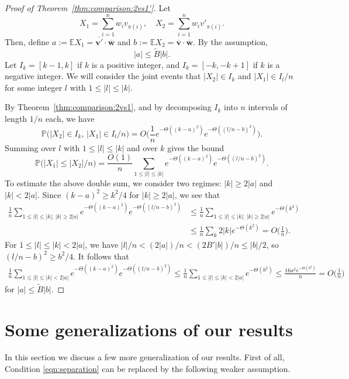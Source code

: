 \documentclass[reqno]{amsart}
\renewcommand\P{{\mathbb{P}}}
\newcommand\E{{\mathbb{E}}}
\newcommand\BMv{{\bm v}}
\newcommand\BMw{{\bm w}}
\theoremstyle{plain}
\theoremstyle{definition}
\begin{document}
\begin{proof}[Proof of Theorem~\ref{thm:comparison:2vs1'}]
Let
\[
X_1 = \sum_{i=1}^{n} w_i v_{\pi(i)}, \quad X_2 = \sum_{i=1}^{n} w_i v'_{\pi(i)}.
\]
Then, define $a:=\E X_1 = \overline{\BMv'} \cdot \overline{\BMw}$ and $b:=\E X_2 = \overline{\BMv} \cdot \overline{\BMw}$. By the assumption, 
\[
|a| \leq \widetilde{B} |b|.
\]
Let $ I_k = [k-1, k] $ if $ k $ is a positive integer, and $ I_k = [-k, -k+1] $ if $ k $ is a negative integer. We will consider the joint events that $|X_{2}| \in I_{k}$ and $|X_{1}| \in I_{l} / n$ for some integer $l$ with $1 \le |l| \le |k|$. 

By Theorem~\ref{thm:comparison:2vs1}, and by decomposing $I_{k}$ into $n$ intervals of length $1/n$ each, we have 
\[
\P\big(|X_{2}| \in I_{k},\, |X_{1}| \in I_{l}/n \big)
= O\Big(\frac{1}{n} e^{-\Theta((k-a)^{2})} e^{-\Theta((l/n-b)^{2})}\Big).
\]
Summing over $l$ with $1\le |l| \le |k|$ and over $k$ gives the bound
\[
\P\big(|X_{1}| \le |X_{2}|/n\big) = \frac{O(1)}{n}\sum_{1\le |l|\le |k|}e^{-\Theta((k-a)^{2})} e^{-\Theta((l/n-b)^{2})}.
\]
To estimate the above double sum, we consider two regimes: $|k| \ge 2|a|$ and $|k|<2|a|$. Since $(k-a)^2 \ge k^2/4$ for $|k|\ge 2|a|$, we see that 
\begin{align*}
\frac{1}{n}\sum_{1\le |l|\le |k|; \, |k|\ge 2|a|}e^{-\Theta((k-a)^{2})} e^{-\Theta((l/n-b)^{2})} &\le \frac{1}{n}\sum_{1\le |l|\le |k|; \, |k|\ge 2|a|}e^{-\Theta(k^{2})}\\
&\le \frac{1}{n}\sum_{k}2|k|e^{-\Theta(k^{2})}=O\Big(\frac{1}{n}\Big).
\end{align*}
For $1\le |l|\le |k|<2|a|$, we have $|l|/n<(2|a|)/n<(2B'|b|)/n\le |b|/2$, so $(l/n-b)^2\ge b^2/4$. It follows that
\begin{align*}
\frac{1}{n}\sum_{1\le |l|\le |k|<2|a|}e^{-\Theta((k-a)^{2})} e^{-\Theta((l/n-b)^{2})} \le \frac{1}{n}\sum_{1\le |l|\le |k|<2|a|}e^{-\Theta(b^{2})} \le \frac{16a^2e^{-\Theta(b^2)}}{n}= O\Big(\frac{1}{n}\Big)
\end{align*}
for $|a|\le \widetilde{B}|b|$.
\end{proof}

\section{Some generalizations of our results}\label{sect:general}
In this section we discuss a few more generalization of our results. First of all, Condition \eqref{eqn:separation} can be replaced by the following weaker assumption.
\end{document}
